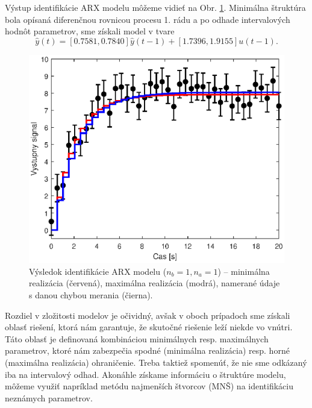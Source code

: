 Výstup identifikácie ARX modelu môžeme vidieť na Obr. \ref{fig:gpe_tf_ex_ARX}. Minimálna štruktúra bola opísaná diferenčnou rovnicou procesu 1. rádu a po odhade intervalových hodnôt parametrov, sme získali model v tvare
\begin{equation*}
	\hat{y}(t) = [0.7581, 0.7840]\hat{y}(t-1) + [1.7396, 1.9155]u(t-1).
\end{equation*}

\begin{figure}
	\centering
	\includegraphics[width=0.7\linewidth]{images/gpe_tf_ex_ARXident}
	\caption{Výsledok identifikácie ARX modelu ($ n_b = 1, n_a = 1 $) -- minimálna realizácia (červená), maximálna realizácia (modrá), namerané údaje s danou chybou merania (čierna).}
	\label{fig:gpe_tf_ex_ARX}
\end{figure}

Rozdiel v zložitosti modelov je očividný, avšak v oboch prípadoch sme získali oblasť riešení, ktorá nám garantuje, že skutočné riešenie leží niekde vo vnútri. Táto oblasť je definovaná kombináciou minimálnych resp. maximálnych parametrov, ktoré nám zabezpečia spodné (minimálna realizácia) resp. horné (maximálna realizácia) ohraničenie. Treba taktiež spomenúť, že nie sme odkázaný iba na intervalový odhad. Akonáhle získame informáciu o štruktúre modelu, môžeme využiť napríklad metódu najmenších štvorcov (MNŠ) na identifikáciu neznámych parametrov. 

